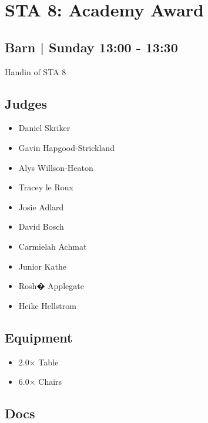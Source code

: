 \documentclass[10pt]{article}
\begin{document}
		\begin{minipage}{\linewidth}
		\setcounter{section}{46}
	\section{STA 8: Academy Award }
	\subsection*{Barn | Sunday 13:00 - 13:30}

	Handin of STA 8

	\begin{multicols}{2}
	\subsection*{\faUsers \: Judges}
	\begin{itemize}
			\item Daniel Skriker
			\item Gavin Hapgood-Strickland
			\item Alys Willson-Heaton
			\item Tracey le Roux
			\item Josie Adlard
			\item David Bosch
			\item Carmielah Achmat
			\item Junior Kathe
			\item Rosh� Applegate
			\item Heike Hellstrom
		\end{itemize}
	\columnbreak
	\subsection*{\faWrench \: Equipment}
	
        \begin{itemize}
                    \item 2.0$\times$ \: Table
                    \item 6.0$\times$ \: Chairs
                \end{itemize}
                \vfill\null
        \subsection*{\faFile \: Docs}
     	\end{multicols}


	\vspace{1cm}
	\end{minipage}
\end{document}
